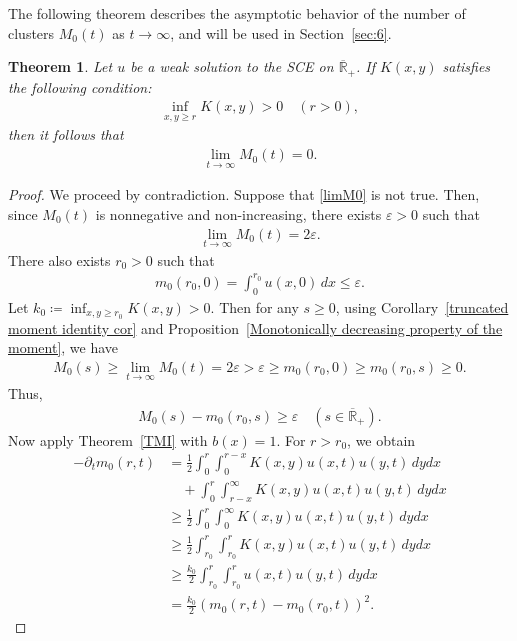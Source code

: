 \documentclass[a4paper,11pt]{article}
\newtheorem{thm}{Theorem}[section]
\def\Rb{\overline{{\mathbb R}}_+}
\begin{document}
The following theorem describes the asymptotic behavior of the number of clusters $M_0(t)$ as $t\to\infty$,
and will be used in Section~\ref{sec:6}.
\begin{thm}\label{M0inf}
Let $u$ be a weak solution to the SCE on $\Rb$.
If $K(x,y)$ satisfies the following condition:
\begin{align}\label{Kr}
\inf_{x,y\geq r}K(x,y) >0\quad (r>0),
\end{align}
then it follows that
\begin{align}\label{limM0}
\lim_{t\to\infty}M_0(t)=0.
\end{align}
\end{thm}
\begin{proof}
We proceed by contradiction. Suppose that \eqref{limM0} is not true.
Then, since $M_0(t)$ is nonnegative and non-increasing, there exists $\varepsilon >0$ such that
\begin{align*}
\lim_{t\to\infty}M_0(t)=2\varepsilon.
\end{align*}
There also exists $r_0>0$ such that
\begin{align*}
m_0(r_0,0) =\int^{r_0}_0 u(x,0)\,dx \leq\varepsilon.
\end{align*}
Let $k_0\coloneq \inf_{x,y\geq r_0}K(x,y)>0$.
Then for any $s\geq0$, using Corollary~\ref{truncated moment identity cor} and Proposition~\ref{Monotonically decreasing property of the moment}, we have
\begin{align*}
M_0(s)\geq\lim_{t\to\infty}M_0(t)=2\varepsilon>\varepsilon\geq m_0(r_0,0)\geq m_0(r_0,s)\geq0.
  \end{align*}
Thus,
  \begin{align}
    M_0(s)-m_0(r_0,s)\geq \varepsilon \quad (s\in \Rb).\label{eq:3}
  \end{align}
Now apply Theorem~\ref{TMI} with $b(x)=1$. For $r>r_0$, we obtain
  \begin{align*}
    -\partial_t m_0 (r,t) &=\frac{1}{2} \int^r_0\int^{r-x}_0 K(x,y)u(x,t)u(y,t)\,dydx \\
    &\quad+\int^r_0\int^\infty_{r-x} K(x,y)u(x,t) u(y,t)\,dydx \\
    &\geq\frac{1}{2} \int^r_0\int^{\infty}_0 K(x,y)u(x,t)u(y,t)\,dydx \\
    &\geq\frac{1}{2} \int^r_{r_0}\int^r_{r_0} K(x,y)u(x,t)u(y,t)\,dydx \\
    &\geq\frac{k_0}{2} \int^r_{r_0}\int^r_{r_0} u(x,t)u(y,t)\,dydx \\
    &=\frac{k_0}{2}(m_0(r,t)-m_0(r_0,t))^2.
  \end{align*}

\end{proof}
\end{document}
